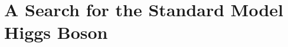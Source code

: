 \chapter{A Search for the Standard Model Higgs Boson} \label{chapter:higgs}






%


%













